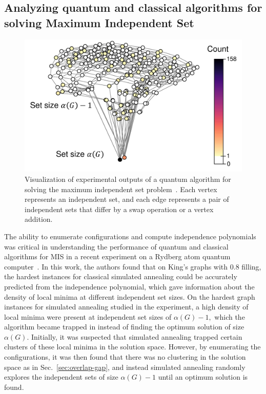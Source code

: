 \documentclass[onefignum, onetabnum]{siamart190516}
\newcommand{\<}{\langle}
\renewcommand{\>}{\rangle}
\begin{document}
\subsection{Analyzing quantum and classical algorithms for solving Maximum Independent Set}
\begin{figure} 
    \centering
    \includegraphics[width=.65\textwidth, trim={0cm 0cm 0cm 0cm}, clip]{figures/exp_configurations.pdf}
    \caption{Visualization of experimental outputs of a quantum algorithm for solving the maximum independent set problem~\cite{Ebadi2022}.
    Each vertex represents an independent set, and each edge represents a pair of independent sets that differ by a swap operation or a vertex addition.}
    \label{fig:exp_configuratoins}
\end{figure}
The ability to enumerate configurations and compute independence polynomials was critical in understanding the performance of quantum and classical algorithms for MIS in a recent experiment on a Rydberg atom quantum computer~\cite{Ebadi2022}.
In this work, the authors found that on King's graphs with $0.8$ filling, the hardest instances for classical simulated annealing could be accurately predicted from the independence polynomial, which gave information about the density of local minima at different independent set sizes.
On the hardest graph instances for simulated annealing studied in the experiment, a high density of local minima were present at independent set sizes of $\alpha(G)-1,$ which the algorithm became trapped in instead of finding the optimum solution of size $\alpha(G)$.
Initially, it was suspected that simulated annealing trapped certain clusters of these local minima in the solution space. However, by enumerating the configurations, it was then found that there was no clustering in the solution space as in Sec.~\ref{sec:overlap-gap}, and instead simulated annealing randomly explores the independent sets of size $\alpha(G)-1$ until an optimum solution is found.
\end{document}
